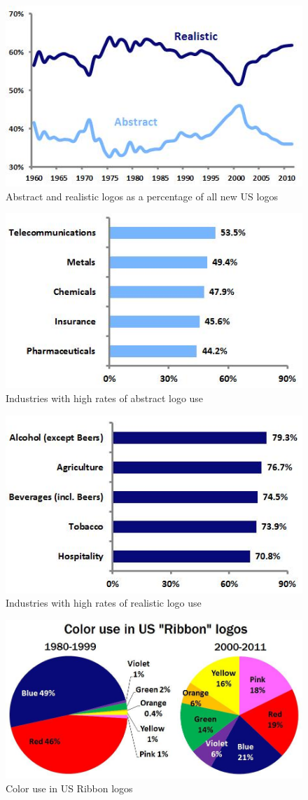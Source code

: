 \begin{figure}[ht]
  \centering
  \includegraphics[width=.5\linewidth]{images/supplement/emblemetrics/abstractrealistic}
  \caption{Abstract and realistic logos as a percentage of all new US logos}
  \label{fig:emblemetrics:abstract-realistic}
\end{figure}

\begin{figure}[ht]
  \centering
  \includegraphics[width=.5\linewidth]{images/supplement/emblemetrics/highabstract}
  \caption{Industries with high rates of abstract logo use}
  \label{fig:emblemetrics:high-abstract}
\end{figure}

\begin{figure}[ht]
  \centering
  \includegraphics[width=.5\linewidth]{images/supplement/emblemetrics/highrealistic}
  \caption{Industries with high rates of realistic logo use}
  \label{fig:emblemetrics:high-realistic}
\end{figure}

\begin{figure}[ht]
  \centering
  \includegraphics[width=.5\linewidth]{images/supplement/emblemetrics/coloruse}
  \caption{Color use in US Ribbon logos}
  \label{fig:emblemetrics:color-use}
\end{figure}

